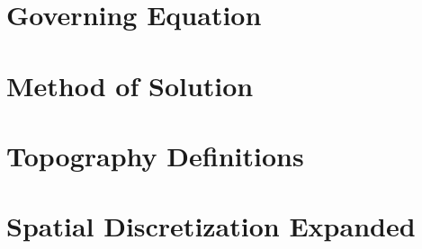 \documentclass[letterpaper]{article}
\begin{document}
\section{Governing Equation} \label{sec:gov_eq}

 
\section{Method of Solution} \label{sec:method_of_sol}


 
\newpage
\begin{appendices}
    \section{Topography Definitions} \label{sec:topography}

    \section{Spatial Discretization Expanded}\label{sec:space_discrete_expand}
    
\end{appendices}

\newpage
\printbibliography
\end{document}

